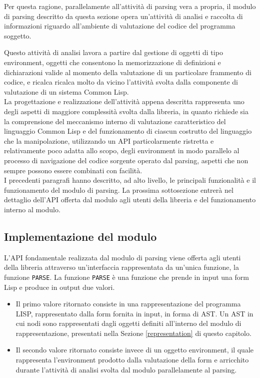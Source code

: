 Per questa ragione, parallelamente all'attività di parsing vera a propria, il
modulo di parsing descritto da questa sezione opera un'attività di analisi e
raccolta di informazioni riguardo all'ambiente di valutazione del codice del
programma soggetto.

Questo attività di analisi lavora a partire dal gestione di oggetti di tipo
environment, oggetti che consentono la memorizzazione di definizioni e
dichiarazioni valide al momento della valutazione di un particolare frammento
di codice, e ricalca ricalca molto da vicino l’attività svolta dalla
componente di valutazione di un sistema Common Lisp.\\

La progettazione e realizzazione dell'attività appena descritta rappresenta
uno degli aspetti di maggiore complessità svolta dalla libreria, in quanto
richiede sia la comprensione del meccanismo interno di valutazione
caratteristico del linguaggio Common Lisp e del funzionamento di ciascun
costrutto del linguaggio che la manipolazione, utilizzando un API
particolarmente ristretta e relativamente poco adatta allo scopo, degli
environment in modo parallelo al processo di navigazione del codice sorgente
operato dal parsing, aspetti che non sempre possono essere combinati con
facilità.\\

I precedenti paragrafi hanno descritto, ad alto livello, le principali
funzionalità e il funzionamento del modulo di parsing. La prossima
sottosezione entrerà nel dettaglio dell'API offerta dal modulo agli utenti
della libreria e del funzionamento interno al modulo.

\subsection{Implementazione del modulo}

L’API fondamentale realizzata dal modulo di parsing viene offerta agli utenti
della libreria attraverso un'interfaccia rappresentata da un’unica funzione,
la funzione \texttt{PARSE}. La funzione \texttt{PARSE} è una funzione che
prende in input una form Lisp e produce in output due valori.

\begin{itemize}

\item Il primo valore ritornato consiste in una rappresentazione del programma
LISP, rappresentato dalla form fornita in input, in forma di AST. Un AST in cui
nodi sono rappresentati dagli oggetti definiti all’interno del modulo di
rappresentazione, presentati nella Sezione \ref{representation} di questo
capitolo.

\item Il secondo valore ritornato consiste invece di un oggetto environment,
il quale rappresenta l’environment prodotto dalla valutazione della form e
arricchito durante l'attività di analisi svolta dal modulo parallelamente al
parsing.

\end{itemize}

